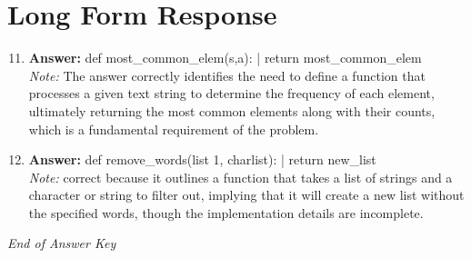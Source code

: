 \documentclass[12pt]{article}
\begin{document}
\section*{Long Form Response}
\begin{enumerate}[label=\arabic*.]
\setcounter{enumi}{10}
\item \textbf{Answer:} def most\_common\_elem(s,a): | return most\_common\_elem
\\ \textit{Note:} The answer correctly identifies the need to define a function that processes a given text string to determine the frequency of each element, ultimately returning the most common elements along with their counts, which is a fundamental requirement of the problem.
\item \textbf{Answer:} def remove\_words(list 1, charlist): | return new\_list
\\ \textit{Note:} correct because it outlines a function that takes a list of strings and a character or string to filter out, implying that it will create a new list without the specified words, though the implementation details are incomplete.
\end{enumerate}

\vfill
\noindent\textit{End of Answer Key}
\end{document}
